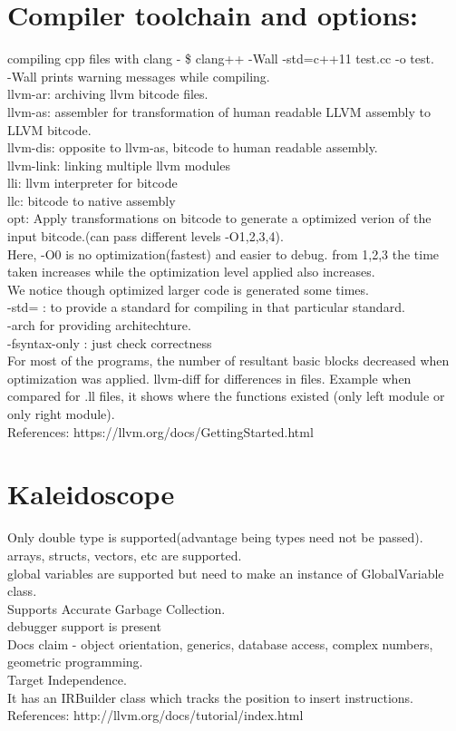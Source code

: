 \documentclass[12pt]{article}
\begin{document}
\section {Compiler toolchain and options:}
compiling cpp files with clang - \$ clang++ -Wall -std=c++11 test.cc -o test.\\
-Wall prints warning messages while compiling.\\
llvm-ar: archiving llvm bitcode files.\\
llvm-as: assembler for transformation of human readable LLVM assembly to LLVM bitcode.\\
llvm-dis: opposite to llvm-as, bitcode to human readable assembly.\\
llvm-link: linking multiple llvm modules\\
lli: llvm interpreter for bitcode\\
llc: bitcode to native assembly\\
opt: Apply transformations on bitcode to generate a optimized verion of the input bitcode.(can pass different levels -O{1,2,3,4}).\\
Here, -O0 is no optimization(fastest) and easier to debug.
from {1,2,3} the time taken increases while the optimization level applied also increases.\\
We notice though optimized larger code is generated some times.\\
-std= : to provide a standard for compiling in that particular standard.\\
-arch for providing architechture.\\
-fsyntax-only : just check correctness\\
For most of the programs, the number of resultant basic blocks decreased when optimization was applied.
llvm-diff for differences in files. Example when compared for .ll files, it shows where the functions existed (only left module or only right module).\\

References: https://llvm.org/docs/GettingStarted.html

\section {Kaleidoscope}
Only double type is supported(advantage being types need not be passed).\\
arrays, structs, vectors, etc are supported.\\
global variables are supported but need to make an instance of GlobalVariable class.\\
Supports Accurate Garbage Collection.\\
debugger support is present\\
Docs claim - object orientation, generics, database access, complex numbers, geometric programming.\\
Target Independence.\\
It has an IRBuilder class which tracks the position to insert instructions.\\

References: http://llvm.org/docs/tutorial/index.html
\end{document}
